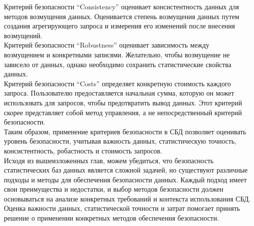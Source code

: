 Критерий безопасности \enquote{Consistency} оценивает консистентность данных для методов возмущения данных. Оценивается степень возмущения данных путем создания агрегирующего запроса и измерения его изменений после внесения возмущений. 
\\

Критерий безопасности \enquote{Robustness} оценивает зависимость между возмущением и конкретными записями. Желательно, чтобы возмущение не зависело от данных, однако необходимо сохранить статистические свойства данных.
\\

Критерий безопасности \enquote{Costs} определяет конкретную стоимость каждого запроса. Пользователю предоставляется начальная сумма, которую он может использовать для запросов, чтобы предотвратить вывод данных. Этот критерий скорее представляет собой метод управления, а не непосредственный критерий безопасности.
\\

Таким образом, применение критериев безопасности в СБД позволяет оценивать уровень безопасности, учитывая важность данных, статистическую точность, консистентность, робастность и стоимость запросов.
\\

Исходя из вышеизложенных глав, можем убедиться, что безопасность статистических баз данных является сложной задачей, но существуют различные подходы и методы для обеспечения безопасности данных. Каждый подход имеет свои преимущества и недостатки, и выбор методов безопасности должен основываться на анализе конкретных требований и контекста использования СБД. Оценка важности данных, статистической точности и затрат помогает принять решение о применении конкретных методов обеспечения безопасности.
